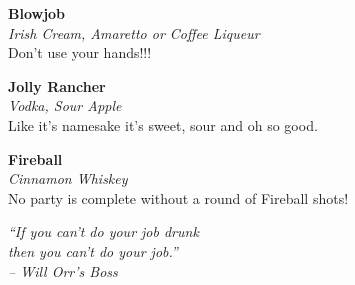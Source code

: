 \documentclass[12pt]{article}
\newcommand{\drink}[3]{
    \begin{center}
        \noindent\large \textbf{#1}\\
        \small \textit{#2}\\
        \normalsize #3\\
        \vspace{10 mm}
    \end{center}
}
\begin{document}
      \drink{Blowjob}{Irish Cream, Amaretto or Coffee Liqueur}{
         Don't use your hands!!!
      }

      \drink{Jolly Rancher}{Vodka, Sour Apple}{
         Like it's namesake it's sweet, sour and oh so good.
      }

      \drink{Fireball}{Cinnamon Whiskey}{
         No party is complete without a round of Fireball shots!
      }

      \vfill
      \begin{center}

      \noindent\textit{
         ``If you can’t do your job drunk \\
            then you can’t do your job.'' \\
            -- Will Orr's Boss
      }
   \end{center}
\end{document}
